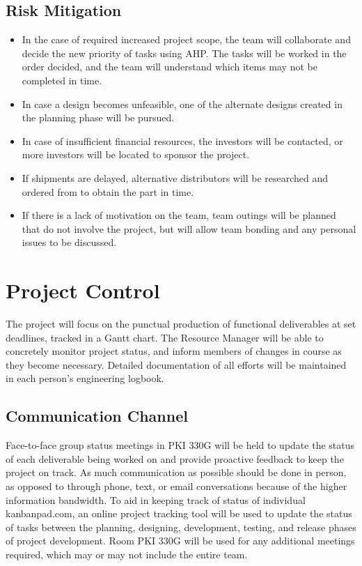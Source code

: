 \documentclass[11pt]{report}
\begin{document}
\subsection{Risk Mitigation}
\begin{itemize}
	\item In the case of required increased project scope, the team will collaborate and decide the new priority of tasks using AHP. The tasks will be worked in the order decided, and the team will understand which items may not be completed in time.
	\item In case a design becomes unfeasible, one of the alternate designs created in the planning phase will be pursued.
	\item In case of insufficient financial resources, the investors will be contacted, or more investors will be located to sponsor the project.
	\item If shipments are delayed, alternative distributors will be researched and ordered from to obtain the part in time.
	\item If there is a lack of motivation on the team, team outings will be planned that do not involve the project, but will allow team bonding and any personal issues to be discussed.
\end{itemize}

\section{Project Control}
The project will focus on the punctual production of functional deliverables at set deadlines, tracked in a Gantt chart.
The Resource Manager will be able to concretely monitor project status, and inform members of changes in course as they become necessary.
Detailed documentation of all efforts will be maintained in each person's engineering logbook.

\subsection{Communication Channel}
Face-to-face group status meetings in PKI 330G will be held to update the status of each deliverable being worked on and provide proactive feedback to keep the project on track.
As much communication as possible should be done in person, as opposed to through phone, text, or email conversations because of the higher information bandwidth.
To aid in keeping track of status of individual kanbanpad.com, an online project tracking tool will be used to update the status of tasks between the planning, designing, development, testing, and release phases of project development.
Room PKI 330G will be used for any additional meetings required, which may or may not include the entire team.
\end{document}
